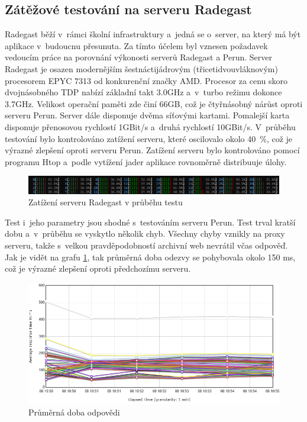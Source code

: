 \subsection{Zátěžové testování na serveru Radegast}
Radegast běží v~rámci školní infrastruktury a~jedná se o~server, na který má být aplikace v~budoucnu přesunuta. Za tímto účelem byl vznesen požadavek vedoucím práce na porovnání výkonosti serverů Radegast a Perun.
\newpara
Server Radegast je osazen modernějším šestnáctijádrovým (třicetidvouvláknovým) procesorem EPYC 7313 od konkurenční značky AMD. Procesor za cenu skoro dvojnásobného TDP nabízí základní takt 3.0GHz a~v~turbo režimu dokonce 3.7GHz. Velikost operační paměti zde činí 66GB, což je čtyřnásobný nárůst oproti serveru Perun. Server dále disponuje dvěma síťovými kartami. Pomalejší karta disponuje přenosovou rychlostí 1GBit/s a~druhá rychlostí 10GBit/s.
\newpara
V~průběhu testování bylo kontrolováno zatížení serveru, které oscilovalo okolo 40~\%, což je výrazné zlepšení oproti serveru Perun.
Zatížení serveru bylo kontrolováno pomocí programu Htop a~podle vytížení jader aplikace 
rovnoměrně distribuuje úlohy.

\begin{figure}[htbp]
    \centering
        \includegraphics[scale=.35]{obrazky-figures/testing/performance/radegast/htop.png}
        \caption{Zatížení serveru Radegast v průběhu testu}
\end{figure}

\noindent
Test i~jeho parametry jsou shodné s~testováním serveru Perun. Test trval kratší dobu a~v~průběhu se vyskytlo několik chyb. Všechny chyby vznikly na proxy serveru, takže s~velkou pravděpodobností archivní web nevrátil včas odpověď. 
\newpage
\noindent
Jak je vidět na grafu \ref{fig:average-response-radegast}, tak průměrná doba odezvy se pohybovala okolo 150 ms, což je výrazné zlepšení oproti předchozímu serveru.
\begin{figure}[htbp]
    \centering
        \includegraphics[scale=.5]{obrazky-figures/testing/performance/radegast/flotResponseTimesOverTime.png}
        \caption{Průměrná doba odpovědi}
        \label{fig:average-response-radegast}
\end{figure}

